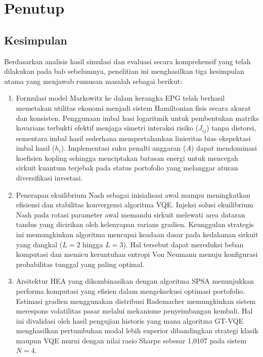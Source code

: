 \chapter{Penutup}
\section{Kesimpulan}
Berdasarkan analisis hasil simulasi dan evaluasi secara komprehensif yang telah dilakukan pada bab sebelumnya, penelitian ini menghasilkan tiga kesimpulan utama yang menjawab rumusan masalah sebagai berikut:
\begin{enumerate}
    \item Formulasi model Markowitz ke dalam kerangka EPG telah berhasil memetakan utilitas ekonomi menjadi sistem Hamiltonian fisis secara akurat dan konsisten. Penggunaan imbal hasi logaritmik untuk pembentukan matriks kovarians terbukti efektif menjaga simetri interaksi risiko ($J_{ij}$) tanpa distorsi, sementara imbal hasil sederhana mempertahankan linieritas bias ekspektasi imbal hasil ($h_i$). Implementasi suku penalti anggaran ($A$) dapat mendominasi koefisien kopling sehingga menciptakan batasan energi untuk mencegah sirkuit kuantum terjebak pada status portofolio yang melanggar aturan diversifikasi investasi.
    \item Penerapan ekuilibrium Nash sebagai inisialisasi awal mampu meningkatkan efisiensi dan stabilitas konvergensi algoritma VQE. Injeksi solusi ekuilibrium Nash pada rotasi parameter awal memandu sirkuit melewati area dataran tandus yang dicirikan oleh kelenyapan varians gradien. Keunggulan strategis ini memungkinkan algoritma mencapai keadaan dasar pada kedalaman sirkuit yang dangkal ($L=2$ hingga $L=3$). Hal tersebut dapat mereduksi beban komputasi dan memicu keruntuhan entropi Von Neumann menuju konfigurasi probabilitas tunggal yang paling optimal.
    \item Arsitektur HEA yang dikombinasikan dengan algoritma SPSA menunjukkan performa komputasi yang efisien dalam mengeksekusi optimasi portofolio. Estimasi gradien menggunakan distribusi Rademacher memungkinkan sistem merespons volatilitas pasar melalui mekanisme penyeimbangan kembali. Hal ini divalidasi oleh hasil pengujian historis yang mana algoritma GT-VQE menghasilkan pertumbuhan modal lebih superior dibandingkan strategi klasik maupun VQE murni dengan nilai rasio Sharpe sebesar 1,0107 pada sistem $N=4$.
\end{enumerate}


